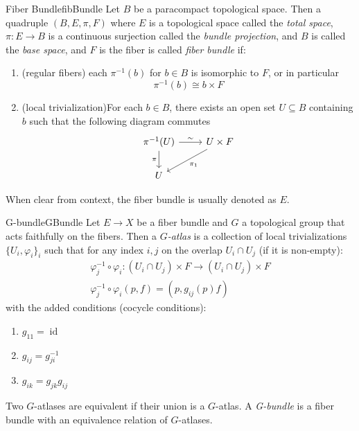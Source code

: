 \documentclass{ut-thesis}
\newcommand{\sse}{\subseteq}
\renewcommand{\phi}{\varphi}
\newcommand{\id}{{\operatorname{id}}}
\begin{document}
\begin{defn}{Fiber Bundle}{fibBundle}
	Let $B$ be a paracompact topological space. Then a quadruple $(B, E, \pi, F)$ where $E$ is
	a topological space called the \emph{total space}, $\pi: E \to B$ is a continuous surjection called the
	\emph{bundle projection}, and $B$ is called the \emph{base space}, and $F$ is the fiber is called
	\emph{fiber bundle} if:
	\begin{enumerate}
		\item (regular fibers) each $\pi^{-1}(b)$ for $b \in B$ is isomorphic to $F$, or in particular
			\[
				\pi^{-1}(b) \cong b\times F
			\]
		\item (local trivialization)For each $ b\in B$, there exists an open set $U \sse B$ containing $b$ such that the following
			diagram commutes
			\[
				\begin{tikzcd}
				\pi^{-1}(U) \arrow[r, "\sim"] \arrow[d, "\pi"'] & U\times F \arrow[ld, "\pi_1"] \\
				U                                               &
				\end{tikzcd}
			\]
	\end{enumerate}
	When clear from context, the fiber bundle is usually denoted as $E$.
\end{defn}

\begin{defn}{G-bundle}{GBundle}
  Let $E \to X$ be a fiber bundle and $G$ a topological group that acts faithfully on the fibers. Then
  a \emph{$G$-atlas} is a collection of local trivializations $\{U_i, \phi_i\}_i$ such that for any index
  $i,j$ on the overlap $U_i\cap U_j$ (if it is non-empty):
  \begin{gather*}
    \phi_j^{-1}\circ \phi_i: (U_i\cap U_j)\times F \to (U_i\cap U_j) \times F \\
    \phi_j^{-1}\circ\phi_i(p, f) = (p, g_{ij}(p)f)
  \end{gather*}
  with the added conditions (cocycle conditions):
  \begin{enumerate}
    \item $g_{11} = \id$
    \item $g_{ij} = g_{ji}^{-1}$
    \item $g_{ik} = g_{jk}g_{ij}$
  \end{enumerate}
  Two $G$-atlases are equivalent if their union is a $G$-atlas. A \emph{G-bundle} is a fiber bundle with an
  equivalence relation of $G$-atlases.
\end{defn}
\end{document}
